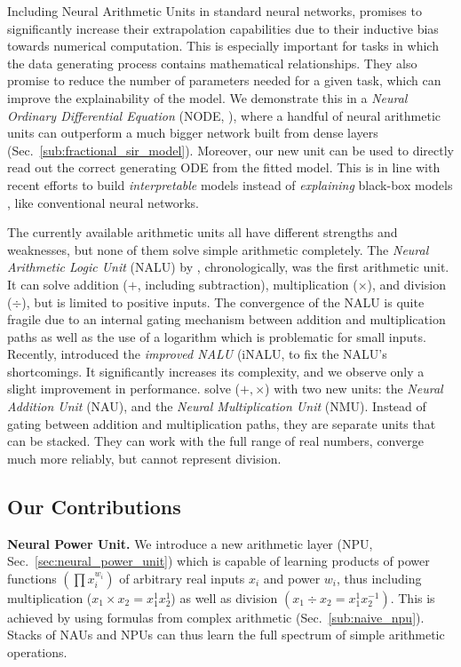 \documentclass[9pt]{article}
\begin{document}
Including Neural Arithmetic Units in standard neural networks, promises to
significantly increase their extrapolation capabilities due to their inductive
bias towards numerical computation. This is especially important for tasks in which
the data generating process contains mathematical relationships.  They also
promise to reduce the number of parameters needed for a given
task, which can improve the explainability of the model.
We demonstrate this in a \emph{Neural Ordinary Differential Equation} (NODE,
\cite{chen_neural_2019}), where a handful of neural arithmetic units can
outperform a much bigger network built from dense layers (Sec.~\ref{sub:fractional_sir_model}).
Moreover, our new unit can be used to directly read out the correct generating ODE
from the fitted model.  This is in line with recent efforts to build
\emph{interpretable} models instead of \emph{explaining} black-box models
\citep{rudin_stop_2019}, like conventional neural networks.

The currently available arithmetic units all have different strengths and
weaknesses, but none of them solve simple arithmetic completely.
The \emph{Neural Arithmetic Logic Unit} (NALU) by \cite{trask_neural_2018},
chronologically, was the first arithmetic unit. It can solve
addition ($+$, including subtraction), multiplication ($\times$), and division
($\div$), but is limited to positive inputs. The convergence of the
NALU is quite fragile due to an internal gating mechanism between addition and
multiplication paths as well as the use of a logarithm which is problematic for
small inputs.  Recently, \cite{schlor_inalu_2020} introduced the \emph{improved NALU} (iNALU,
to fix the NALU's shortcomings. It significantly increases its complexity, and we
observe only a slight improvement in performance.
\cite{madsen_neural_2020} solve ($+,\times$) with two new units: the
\emph{Neural Addition Unit} (NAU), and the \emph{Neural Multiplication Unit}
(NMU). Instead of gating between addition and multiplication paths, they are
separate units that can be stacked. They can work with the full range of real
numbers, converge much more reliably, but cannot represent
division.


\subsection*{Our Contributions}%
\label{sub:our_contribution}

\textbf{Neural Power Unit.}
We introduce a new arithmetic layer (NPU, Sec.~\ref{sec:neural_power_unit})
which is capable of learning products of power functions $(\prod x_{i}^{w_i})$ of
arbitrary real inputs $x_i$ and power $w_i$, thus including multiplication
($x_1\times x_2 = x_1^1 x_2^1$) as well as division $(x_1\div
x_2=x_1^{1}x_2^{-1})$. This is achieved by using formulas from complex
arithmetic (Sec.~\ref{sub:naive_npu}).  Stacks of NAUs and NPUs can thus learn
the full spectrum of simple arithmetic operations.
\end{document}
